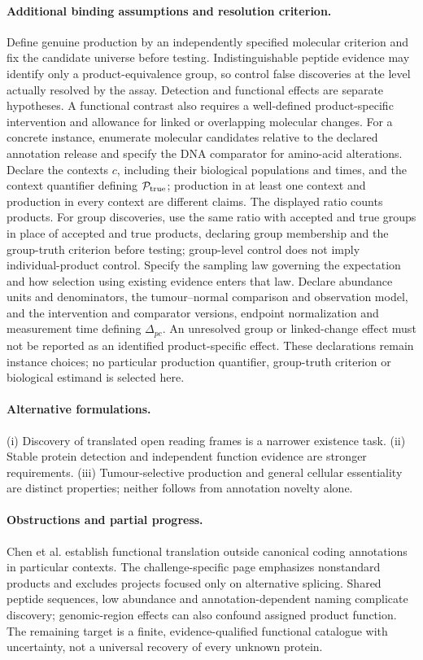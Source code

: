 \documentclass[11pt]{article}
\begin{document}
\paragraph{Additional binding assumptions and resolution criterion.} Define genuine production by an independently specified molecular criterion and fix the candidate universe before testing. Indistinguishable peptide evidence may identify only a product-equivalence group, so control false discoveries at the level actually resolved by the assay. Detection and functional effects are separate hypotheses. A functional contrast also requires a well-defined product-specific intervention and allowance for linked or overlapping molecular changes. For a concrete instance, enumerate molecular candidates relative to the declared annotation release and specify the DNA comparator for amino-acid alterations. Declare the contexts $c$, including their biological populations and times, and the context quantifier defining $\mathcal P_{\rm true}$; production in at least one context and production in every context are different claims. The displayed ratio counts products. For group discoveries, use the same ratio with accepted and true groups in place of accepted and true products, declaring group membership and the group-truth criterion before testing; group-level control does not imply individual-product control. Specify the sampling law governing the expectation and how selection using existing evidence enters that law. Declare abundance units and denominators, the tumour--normal comparison and observation model, and the intervention and comparator versions, endpoint normalization and measurement time defining $\Delta_{pc}$. An unresolved group or linked-change effect must not be reported as an identified product-specific effect. These declarations remain instance choices; no particular production quantifier, group-truth criterion or biological estimand is selected here.

\paragraph{Alternative formulations.} (i) Discovery of translated open reading frames is a narrower existence task. (ii) Stable protein detection and independent function evidence are stronger requirements. (iii) Tumour-selective production and general cellular essentiality are distinct properties; neither follows from annotation novelty alone.
\paragraph{Obstructions and partial progress.} Chen et al. establish functional translation outside canonical coding annotations in particular contexts. The challenge-specific page emphasizes nonstandard products and excludes projects focused only on alternative splicing. Shared peptide sequences, low abundance and annotation-dependent naming complicate discovery; genomic-region effects can also confound assigned product function. The remaining target is a finite, evidence-qualified functional catalogue with uncertainty, not a universal recovery of every unknown protein.
\end{document}
